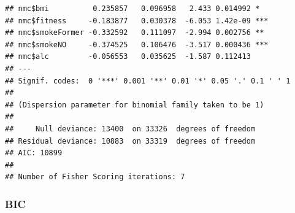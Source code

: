 \documentclass{article}\usepackage[]{graphicx}\usepackage[]{xcolor}
\makeatletter
\newenvironment{kframe}{%
 \def\at@end@of@kframe{}%
 \ifinner\ifhmode%
  \def\at@end@of@kframe{\end{minipage}}%
  \begin{minipage}{\columnwidth}%
 \fi\fi%
 \def\FrameCommand##1{\hskip\@totalleftmargin \hskip-\fboxsep
 \colorbox{shadecolor}{##1}\hskip-\fboxsep
     \hskip-\linewidth \hskip-\@totalleftmargin \hskip\columnwidth}%
 \MakeFramed {\advance\hsize-\width
   \@totalleftmargin\z@ \linewidth\hsize
   \@setminipage}}%
 {\par\unskip\endMakeFramed%
 \at@end@of@kframe}
\newenvironment{knitrout}{}{} %
\makeatother
\begin{document}
\begin{knitrout}
\begin{kframe}
\begin{verbatim}
## nmc$bmi          0.235857   0.096958   2.433 0.014992 *  
## nmc$fitness     -0.183877   0.030378  -6.053 1.42e-09 ***
## nmc$smokeFormer -0.332592   0.111097  -2.994 0.002756 ** 
## nmc$smokeNO     -0.374525   0.106476  -3.517 0.000436 ***
## nmc$alc         -0.056553   0.035625  -1.587 0.112413    
## ---
## Signif. codes:  0 '***' 0.001 '**' 0.01 '*' 0.05 '.' 0.1 ' ' 1
## 
## (Dispersion parameter for binomial family taken to be 1)
## 
##     Null deviance: 13400  on 33326  degrees of freedom
## Residual deviance: 10883  on 33319  degrees of freedom
## AIC: 10899
## 
## Number of Fisher Scoring iterations: 7
\end{verbatim}
\end{kframe}
\end{knitrout}
          
        \subsubsection{BIC}
\end{document}
